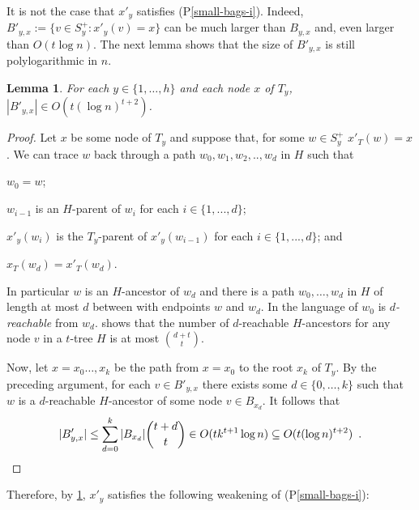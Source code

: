 \documentclass{patmorin}
\newcommand{\pref}[1]{(P\ref{#1})}
\newtheorem{lemma}{Lemma}
\begin{document}

It is not the case that $x'_y$ satisfies \pref{small-bags-i}.  Indeed, $B'_{y,x}:=\{v\in S^+_y: x'_y(v)=x\}$ can be much larger than $B_{y,x}$ and, even larger than $O(t\log n)$.  The next lemma shows that the size of $B'_{y,x}$ is still polylogarithmic in $n$.

\begin{lemma}\label{small-bags-ii-lem}
    For each $y\in\{1,\ldots,h\}$ and each node $x$ of $T_y$, $|B'_{y,x}|\in O(t(\log n)^{t+2})$.
\end{lemma}

\begin{proof}
    Let $x$ be some node of $T_y$ and suppose that, for some $w\in S^+_y$ $x'_T(w)=x$.  We can trace $w$ back through a path $w_0,w_1,w_2,..,w_d$ in $H$ such that
    \begin{compactenum}[(a)]
        \item $w_0=w$;
        \item $w_{i-1}$ is an $H$-parent of $w_i$ for each $i\in\{1,...,d\}$;
        \item $x'_y(w_{i})$ is the $T_y$-parent of $x'_y(w_{i-1})$ for each $i\in\{1,...,d\}$; and
        \item $x_T(w_d)=x'_T(w_d)$.
    \end{compactenum}
    In particular $w$ is an $H$-ancestor of $w_d$ and there is a path $w_0,\ldots,w_d$ in $H$ of length at most $d$ between with endpoints $w$ and $w_d$.  In the language of \citet{pilipczuk.siebertz:polynomial} $w_0$ is \emph{$d$-reachable} from $w_d$.  \citet[Lemma~13]{pilipczuk.siebertz:polynomial-arxiv} shows that the number of $d$-reachable $H$-ancestors for any node $v$ in a $t$-tree $H$ is at most $\binom{d+t}{t}$.

    Now, let $x=x_0\ldots,x_k$ be the path from $x=x_0$ to the root $x_k$ of $T_y$. By the preceding argument, for each $v\in B'_{y,x}$ there exists some $d\in\{0,\ldots,k\}$ such that $w$ is a $d$-reachable $H$-ancestor of some node $v\in B_{x_d}$.  It follows that
    \[
        |B'_{y,x}|
            \le \sum_{d=0}^k |B_{x_d}|\binom{t+d}{t}
            \in O(tk^{t+1}\log n)
            \subseteq O(t(\log n)^{t+2}) \enspace . \qedhere
    \]
\end{proof}

Therefore, by \cref{small-bags-ii-lem}, $x'_y$ satisfies the following weakening of \pref{small-bags-i}:
\end{document}
